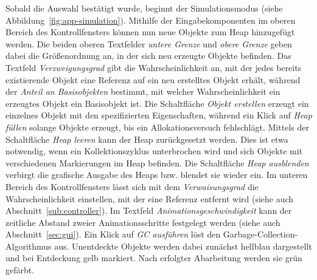 Sobald die Auswahl bestätigt wurde, beginnt der Simulationsmodus (siehe Abbildung~\ref{fig:app-simulation}).
Mithilfe der Eingabekomponenten im oberen Bereich des Kontrollfensters können nun neue Objekte zum Heap hinzugefügt werden.
Die beiden oberen Textfelder \textit{untere Grenze} und \textit{obere Grenze} geben dabei die Größenordnung an, in der sich neu erzeugte Objekte befinden.
Das Textfeld \textit{Verzweigungsgrad} gibt die Wahrscheinlichkeit an, mit der jedes bereits existierende Objekt eine Referenz auf ein neu erstelltes Objekt erhält, während der \textit{Anteil an Basisobjekten} bestimmt, mit welcher Wahrscheinlichkeit ein erzeugtes Objekt ein Basisobjekt ist.
Die Schaltfläche \textit{Objekt erstellen} erzeugt ein einzelnes Objekt mit den spezifizierten Eigenschaften, während ein Klick auf \textit{Heap füllen} solange Objekte erzeugt, bis ein Allokationsversuch fehlschlägt.
Mittels der Schaltfläche \textit{Heap leeren} kann der Heap zurückgesetzt werden.
Dies ist etwa notwendig, wenn ein Kollektionszyklus unterbrochen wird und sich Objekte mit verschiedenen Markierungen im Heap befinden.
Die Schaltfläche \textit{Heap ausblenden} verbirgt die grafische Ausgabe des Heaps bzw. blendet sie wieder ein.
Im unteren Bereich des Kontrollfensters lässt sich mit dem \textit{Verwaisungsgrad} die Wahrscheinlichkeit einstellen, mit der eine Referenz entfernt wird (siehe auch Abschnitt~\ref{sub:controller}).
Im Textfeld \textit{Animationsgeschwindigkeit} kann der zeitliche Abstand zweier Animationsschritte festgelegt werden (siehe auch Abschnitt~\ref{sec:gui}).
Ein Klick auf \textit{GC ausführen} löst den Garbage-Collection-Algorithmus aus.
Unentdeckte Objekte werden dabei zunächst hellblau dargestellt und bei Entdeckung gelb markiert.
Nach erfolgter Abarbeitung werden sie grün gefärbt.

